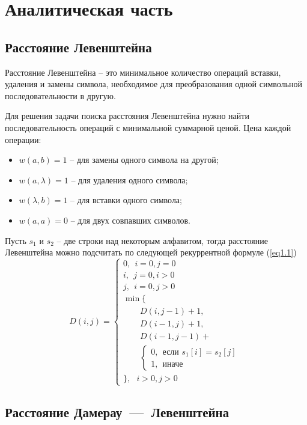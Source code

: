 \chapter{Аналитическая часть}

\section{Расстояние Левенштейна}

Расстояние Левенштейна -- это минимальное количество операций вставки, удаления и замены символа, необходимое для преобразования одной символьной последовательности в другую.

Для решения задачи поиска расстояния Левенштейна нужно найти последовательность операций с минимальной суммарной ценой. Цена каждой операции:
\begin{itemize}[left=\parindent]
	\item $w(a, b) = 1$ -- для замены одного символа на другой;
	\item $w(a, \lambda) = 1$ -- для удаления одного символа;
	\item $w(\lambda, b) = 1$ -- для вставки одного символа;
	\item $w(a, a) = 0$ -- для двух совпавших символов.
\end{itemize}

Пусть $s_1$ и $s_2$ -- две строки над некоторым алфавитом, тогда расстояние Левенштейна можно подсчитать по следующей рекуррентной формуле (\ref{eq1.1})
\begin{equation}
	\label{eq1.1}
	D(i, j) = \begin{cases}
		0, ~~\text{$i = 0, j = 0$}\\
		i, ~~\text{$j = 0, i > 0$}\\
		j, ~~\text{$i = 0, j > 0$}\\
		\min \lbrace \\
		\qquad D(i, j - 1) + 1,\\
		\qquad D(i - 1, j) + 1,\\
		\qquad D(i - 1, j - 1) + \\
		\qquad \begin{cases}
			0, ~~\text{если $s_1[i] = s_2[j]$}\\
			1, ~~\text{иначе}
		\end{cases}\\
		\rbrace, ~~~\text{$i > 0, j > 0$}
	\end{cases}
\end{equation}

\section{Расстояние Дамерау~---~Левенштейна}

